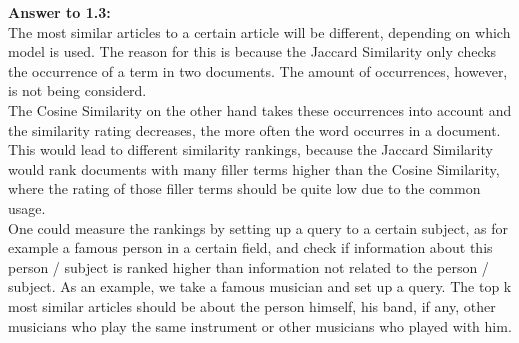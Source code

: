 \documentclass{WeSTassignment}
\begin{document}
\textbf{Answer to 1.3:} \\
The most similar articles to a certain article will be different, depending on which model is used. The reason for this is because the Jaccard Similarity only checks the occurrence of a term in two documents. The amount of occurrences, however, is not being considerd.\\
The Cosine Similarity on the other hand takes these occurrences into account and the similarity rating decreases, the more often the word occurres in a document.
This would lead to different similarity rankings, because the Jaccard Similarity would rank documents with many filler terms higher than the Cosine Similarity, where the rating of those filler terms should be quite low due to the common usage.\\
One could measure the rankings by setting up a query to a certain subject, as for example a famous person in a certain field, and check if information about this person / subject is ranked higher than information not related to the person / subject. As an example, we take a famous musician and set up a query. The top k most similar articles should be about the person himself, his band, if any, other musicians who play the same instrument or other musicians who played with him.
\end{document}
